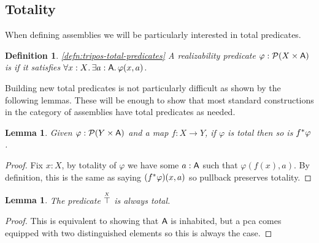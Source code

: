 \documentclass[11pt]{article}
\newtheorem{lemm}[thrm]{Lemma}
\newtheorem{defn}[thrm]{Definition}
\begin{document}

\subsection{Totality}

When defining assemblies we will be particularly interested in total
predicates.

\begin{defn}\ref{defn:tripos-total-predicates}
  A realizability predicate \(\varphi : \mathcal{P}{({X}\times{\ensuremath{\mathsf{A}}})}\) is 
  if it satisfies \(\forall{x:X}.\,{\exists{a:\ensuremath{\mathsf{A}}}.\,{\varphi(x,a)}}\).
\end{defn}

Building new total predicates is not particularly difficult as shown by
the following lemmas.
%
These will be enough to show that most standard constructions in the
category of assemblies have total predicates as needed.

\begin{lemm}\label{lemm:pullback-preserves-total}
  Given \(\varphi : \mathcal{P}{({Y}\times{\ensuremath{\mathsf{A}}})}\) and a map \(f : X \to Y\), if
  \(\varphi\) is total then so is \({f}^\ast\varphi\).
\end{lemm}
\begin{proof}
  Fix \(x:X\), by totality of \(\varphi\) we have some \(a:\mathsf{A}\) such that
  \(\varphi(f(x),a)\).
  By definition, this is the same as saying \(({f}^\ast\varphi)(x,a)\) so
  pullback preserves totality.
\end{proof}

\begin{lemm}\label{lemm:top-total}
  The predicate \(\overset{\scriptscriptstyle X}{\top}\) is always total.
\end{lemm}
\begin{proof}
  This is equivalent to showing that \(\mathsf{A}\) is inhabited, but a pca
  comes equipped with two distinguished elements so this is always the case.
\end{proof}
\end{document}
